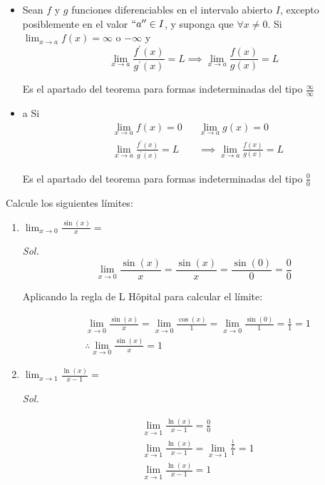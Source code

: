 \begin{theorem}[L' Hôpital]
	\begin{itemize}
		\item Sean $f$ y $g$ funciones diferenciables en el intervalo abierto $I$, excepto posiblemente en el valor $``a^{\prime\prime}\in I$, y suponga que $\forall x \neq 0$. Si $\lim_{x\to a}f(x)=\infty$ o $-\infty$ y
		      \begin{equation}
			      \lim_{x\to a}\frac{f^{\prime}(x)}{g^{\prime}(x)}=L\implies \lim_{x\to a}\frac{f(x)}{g(x)}=L
		      \end{equation}

		      Es el apartado del teorema para formas indeterminadas del tipo $\frac{\infty}{\infty}$

		\item a Si \begin{align*}
			       & \lim_{x\to a} f(x)=0                                &  & \lim_{x\to a}g(x)=0                        \\
			       & \lim_{x\to a} \frac{f^{\prime}(x)}{g^{\prime}(x)}=L &  & \implies \lim_{x\to a} \frac{f(x)}{g(x)}=L
		      \end{align*}

		      Es el apartado del teorema para formas indeterminadas del tipo $\frac{0}{0}$

	\end{itemize}
\end{theorem}

\begin{example}
	Calcule los siguientes límites:
	\begin{enumerate}
		\item $\lim_{x\to 0}\frac{\sin(x)}{x}=$

		      \textit{ Sol. }
		      \begin{equation*}
			      \lim_{x\to 0}\frac{\sin(x)}{x}=\frac{\sin(x)}{x}=\frac{\sin(0)}{0}=\frac{0}{0}
		      \end{equation*}

		      Aplicando la regla de L Hôpital para calcular el límite:

		      \begin{align*}
			       & \lim_{x\to 0}\frac{\sin(x)}{x}=\lim_{x\to 0}\frac{\cos(x)}{1}=\lim_{x\to 0}\frac{\sin(0)}{1}=\frac{1}{1}=1 \\
			       & \therefore \lim_{x\to 0}\frac{\sin(x)}{x}=1
		      \end{align*}

		\item $\lim_{x\to 1}\frac{\ln(x)}{x-1}=$

		      \textit{ Sol. }

		      \begin{align*}
			       & \lim_{x\to 1}\frac{\ln(x)}{x-1}=\frac{0}{0}                          \\
			       & \lim_{x\to 1}\frac{\ln(x)}{x-1}=\lim_{x\to 1}\frac{\frac{1}{x}}{1}=1 \\
			       & \lim_{x\to 1}\frac{\ln(x)}{x-1}=1
		      \end{align*}
	\end{enumerate}

\end{example}

